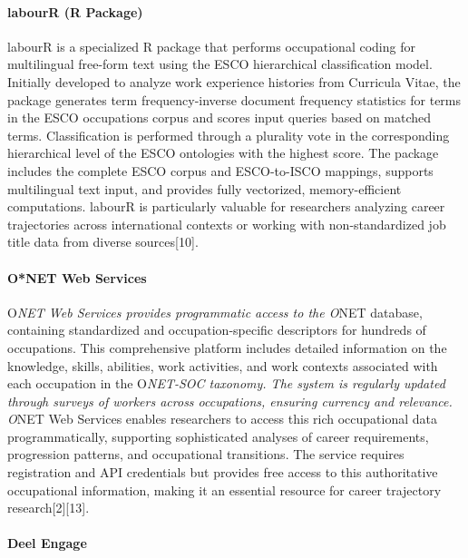 \documentclass[./main.tex]{subfiles}
\begin{document}
\paragraph{labourR (R Package)}\label{labourr-r-package}

labourR is a specialized R package that performs occupational coding for
multilingual free-form text using the ESCO hierarchical classification
model. Initially developed to analyze work experience histories from
Curricula Vitae, the package generates term frequency-inverse document
frequency statistics for terms in the ESCO occupations corpus and scores
input queries based on matched terms. Classification is performed
through a plurality vote in the corresponding hierarchical level of the
ESCO ontologies with the highest score. The package includes the
complete ESCO corpus and ESCO-to-ISCO mappings, supports multilingual
text input, and provides fully vectorized, memory-efficient
computations. labourR is particularly valuable for researchers analyzing
career trajectories across international contexts or working with
non-standardized job title data from diverse sources{[}10{]}.

\paragraph{O*NET Web Services}\label{onet-web-services}

O\emph{NET Web Services provides programmatic access to the O}NET
database, containing standardized and occupation-specific descriptors
for hundreds of occupations. This comprehensive platform includes
detailed information on the knowledge, skills, abilities, work
activities, and work contexts associated with each occupation in the
O\emph{NET-SOC taxonomy. The system is regularly updated through surveys
of workers across occupations, ensuring currency and relevance. O}NET
Web Services enables researchers to access this rich occupational data
programmatically, supporting sophisticated analyses of career
requirements, progression patterns, and occupational transitions. The
service requires registration and API credentials but provides free
access to this authoritative occupational information, making it an
essential resource for career trajectory research{[}2{]}{[}13{]}.

\paragraph{Deel Engage}\label{deel-engage}
\end{document}
